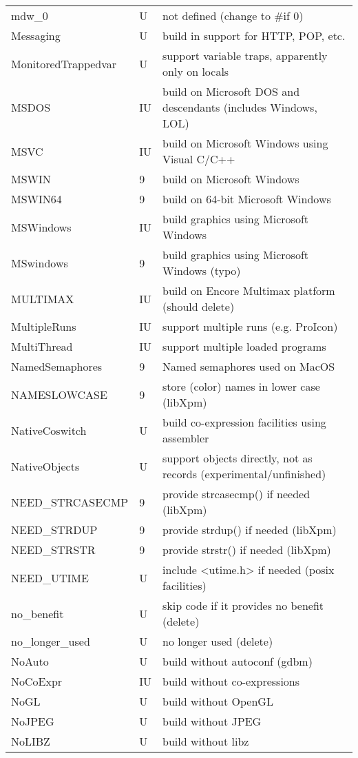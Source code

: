\begin{xtabular}{|m{1.8in}|m{0.5in}|m{4.0in}|}
mdw\_0 & U & not defined (change to \#if 0) \\
Messaging & U & build in support for HTTP, POP, etc. \\
MonitoredTrappedvar & U & support variable traps, apparently only on locals \\
MSDOS & IU & build on Microsoft DOS and descendants (includes Windows, LOL) \\
MSVC & IU & build on Microsoft Windows using Visual C/C++ \\
MSWIN & 9 & build on Microsoft Windows \\
MSWIN64 & 9 & build on 64-bit Microsoft Windows \\
MSWindows & IU & build graphics using Microsoft Windows \\
MSwindows & 9 & build graphics using Microsoft Windows (typo) \\
MULTIMAX & IU & build on Encore Multimax platform (should delete) \\
MultipleRuns & IU & support multiple runs (e.g. ProIcon) \\
MultiThread & IU & support multiple loaded programs \\
NamedSemaphores & 9 & Named semaphores used on MacOS \\
NAMESLOWCASE & 9 & store (color) names in lower case (libXpm) \\
NativeCoswitch & U & build co-expression facilities using assembler \\
NativeObjects & U & support objects directly, not as records (experimental/unfinished) \\
NEED\_STRCASECMP & 9 & provide strcasecmp() if needed (libXpm) \\
NEED\_STRDUP & 9 & provide strdup() if needed (libXpm) \\
NEED\_STRSTR & 9 & provide strstr() if needed (libXpm) \\
NEED\_UTIME & U & include <utime.h> if needed (posix facilities) \\
no\_benefit & U & skip code if it provides no benefit (delete) \\
no\_longer\_used & U & no longer used (delete) \\
NoAuto & U & build without autoconf (gdbm) \\
NoCoExpr & IU & build without co-expressions \\
NoGL & U & build without OpenGL \\
NoJPEG & U & build without JPEG \\
NoLIBZ & U & build without libz \\

\end{xtabular}
